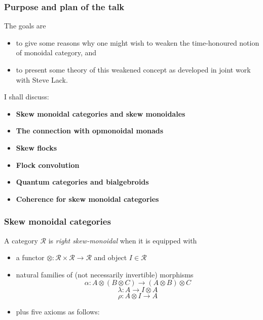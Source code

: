 \documentclass{beamer}
\newcommand{\lra}{\longrightarrow}
\def\CR{{\mathscr R}}
\begin{document}
\begin{frame}
  \frametitle{Purpose and plan of the talk}

The goals are 
\begin{itemize}

\item to give some reasons why one might wish to weaken 
the time-honoured notion of monoidal category, and 
\pause
\item to present some theory of this weakened concept 
as developed in joint work with Steve Lack. 
\end{itemize}
\pause
I shall discuss:
 
\begin{itemize}

\item<1-> \textbf{Skew monoidal categories and skew monoidales} \\ 
\pause
\item<2-> \textbf{The connection with opmonoidal monads} \\
\pause
\item<3-> \textbf{Skew flocks} \\
\pause
\item<4-> \textbf{Flock convolution} \\
\pause
\item<5-> \textbf{Quantum categories and bialgebroids} \\
\pause
\item<6-> \textbf{Coherence for skew monoidal categories}

\end{itemize}

\end{frame}

\begin{frame}
  \frametitle{Skew monoidal categories}

A category $\CR$ is {\em right skew-monoidal} when it is equipped with 

  \begin{itemize}
\item<1-> a functor $\otimes : \CR \times \CR \lra \CR$ and object $I\in \CR$ 

\item<2-> natural families of (not necessarily invertible) morphisms 
$$\alpha : A\otimes (B\otimes C) \lra (A\otimes B)\otimes C$$ 
$$\lambda : A\lra I\otimes A$$
$$\rho : A\otimes I \lra A$$ 

\item<3-> plus five axioms as follows:

\end{itemize}

\end{frame}
\end{document}
